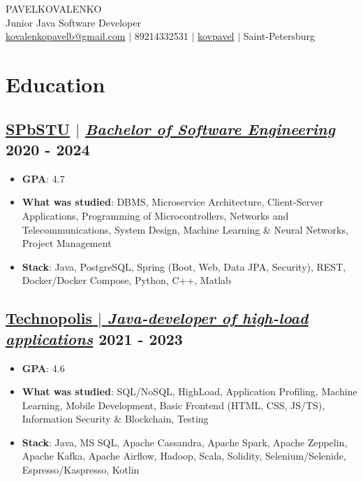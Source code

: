 \documentclass[11pt]{article}
\begin{document}
\begin{center}
    {\fontsize{36}{36}\selectfont\interthin PAVEL\interheavy KOVALENKO} \\ \bigskip
    {\fontsize{25}{25}\selectfont\interthin Junior Java Software Developer} \\ \bigskip
    {\color{icnclr}\faEnvelope[regular]} \href{mailto:paaavel.2024@gmail.com}{kovalenkopavelb@gmail.com} $|$ 
    {\color{icnclr}} 89214332531 $|$
    {\color{icnclr}\faGithub} \href{https://github.com/kovpavel}{kovpavel} $|$
    {\color{icnclr}\faMapMarker} Saint-Petersburg
\end{center}

\section{Education}
\subsection{\href{https://www.spbstu.ru/}{\underline{SPbSTU}} $|$ {\normalfont\textit{\href{https://www.spbstu.ru/structure/graduate_school_software_engineering/}{\underline{Bachelor of Software Engineering}}}} \hfill 2020 - 2024}
\begin{itemize}
    \item \textbf{GPA}: 4.7
    \item \textbf{What was studied}: DBMS, Microservice Architecture, Client-Server Applications, Programming of Microcontrollers, Networks and Telecommunications, System Design, Machine Learning \& Neural Networks, Project Management
    \item \textbf{Stack}: Java, PostgreSQL, Spring (Boot, Web, Data JPA, Security), REST, Docker/Docker Compose, Python, C++, Matlab
\end{itemize}

\subsection{\href{https://polis.vk.company/}{\underline{Technopolis} $|$ {\normalfont\textit{\underline{Java-developer of high-load applications}}}} \hfill 2021 - 2023}
\begin{itemize}
    \item \textbf{GPA}: 4.6
    \item \textbf{What was studied}: SQL/NoSQL, HighLoad, Application Profiling, Machine Learning, Mobile Development, Basic Frontend (HTML, CSS, JS/TS), Information Security \& Blockchain, Testing
    \item \textbf{Stack}: Java, MS SQL, Apache Cassandra, Apache Spark, Apache Zeppelin, Apache Kafka, Apache Airflow, Hadoop, Scala, Solidity, Selenium/Selenide, Espresso/Kaspresso, Kotlin
\end{itemize}
\end{document}
